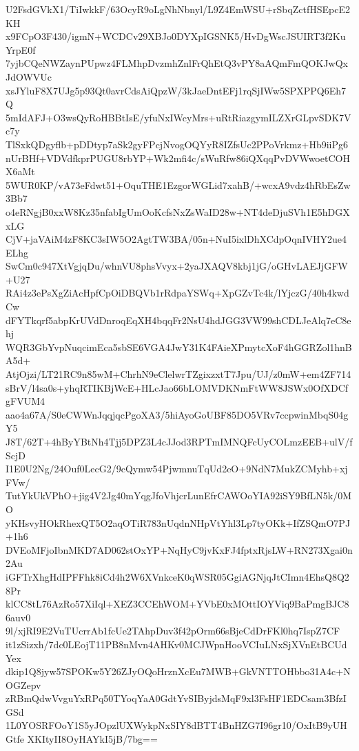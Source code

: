U2FsdGVkX1/TiIwkkF/63OcyR9oLgNhNbnyl/L9Z4EmWSU+rSbqZctfHSEpcE2KH
x9FCpO3F430/igmN+WCDCv29XBJo0DYXpIGSNK5/HvDgWscJSUIRT3f2KuYrpE0f
7yjbCQeNWZaynPUpwz4FLMhpDvzmhZnlFrQhEtQ3vPY8aAQmFmQOKJwQxJdOWVUc
xsJYluF8X7UJg5p93Qt0avrCdsAiQpzW/3kJaeDntEFj1rqSjIWw5SPXPPQ6Eh7Q
5mIdAFJ+O3wsQyRoHBBtIsE/yfuNxIWcyMrs+uRtRiazgymILZXrGLpvSDK7Vc7y
TlSxkQDgyflb+pDDtyp7aSk2gyFPcjNvogOQYyR8IZfsUc2PPoVrkmz+Hb9iiPg6
nUrBHf+VDVdfkprPUGU8rbYP+Wk2mfi4c/sWuRfw86iQXqqPvDVWwoetCOHX6aMt
5WUR0KP/vA73eFdwt51+OquTHE1EzgorWGLid7xahB/+wcxA9vdz4hRbEsZw3Bb7
o4eRNgjB0xxW8Kz35nfabIgUmOoKcfsNxZsWaID28w+NT4deDjuSVh1E5hDGXxLG
CjV+jaVAiM4zF8KC3sIW5O2AgtTW3BA/05n+NuI5ixlDhXCdpOqnIVHY2ue4ELhg
SwCm0c947XtVgjqDu/whnVU8phsVvyx+2yaJXAQV8kbj1jG/oGHvLAEJjGFW+U27
RAi4z3ePsXgZiAcHpfCpOiDBQVb1rRdpaYSWq+XpGZvTc4k/lYjczG/40h4kwdCw
dFYTkqrf5abpKrUVdDnroqEqXH4bqqFr2NsU4hdJGG3VW99shCDLJeAlq7eC8ehj
WQR3GbYvpNuqcimEca5sbSE6VGA4JwY31K4FAieXPmytcXoF4hGGRZol1hnBA5d+
AtjOjzi/LT21RC9n85wM+ChrhN9eClelwrTZgixzxtT7Jpu/UJ/z0mW+em4ZF714
sBrV/l4sa0s+yhqRTIKBjWcE+HLcJao66bLOMVDKNmFtWW8JSWx0OfXDCfgFVUM4
aao4a67A/S0eCWWnJqqjqcPgoXA3/5hiAyoGoUBF85DO5VRv7ccpwinMbqS04gY5
J8T/62T+4hByYBtNh4Tjj5DPZ3L4cJJod3RPTmIMNQFcUyCOLmzEEB+ulV/fScjD
I1E0U2Ng/24Ouf0LecG2/9cQymw54PjwmnuTqUd2eO+9NdN7MukZCMyhb+xjFVw/
TutYkUkVPhO+jig4V2Jg40mYqgJfoVhjcrLunEfrCAWOoYIA92iSY9BfLN5k/0MO
yKHsvyHOkRhexQT5O2aqOTiR783nUqdnNHpVtYhl3Lp7tyOKk+IfZSQmO7PJ+1h6
DVEoMFjoIbnMKD7AD062stOxYP+NqHyC9jvKxFJ4fptxRjsLW+RN273Xgai0n2Au
iGFTrXhgHdIPFFhk8iCd4h2W6XVnkceK0qWSR05GgiAGNjqJtCImn4EhsQ8Q28Pr
klCC8tL76AzRo57XiIql+XEZ3CCEhWOM+YVbE0xMOttIOYViq9BaPmgBJC86auv0
9l/xjRI9E2VuTUcrrAb1fcUe2TAhpDuv3f42pOrm66sBjeCdDrFKl0hq7IspZ7CF
it1zSizxh/7dc0LEojT11PB8nMvn4AHKv0MCJWpnHooVCIuLNxSjXVnEtBCUdYex
dkip1Q8jyw57SPOKw5Y26ZJyOQoHrznXcEu7MWB+GkVNTTOHbbo31A4c+NOGZepv
zRBmQdwVvguYxRPq50TYoqYaA0GdtYvSIByjdsMqF9xl3FsHF1EDCsam3BfzIGSd
1L0YOSRFOoY1S5yJOpzlUXWykpNxSIY8dBTT4BnHZG7I96gr10/OxItB9yUHGtfe
XKItyII8OyHAYkI5jB/7bg==
